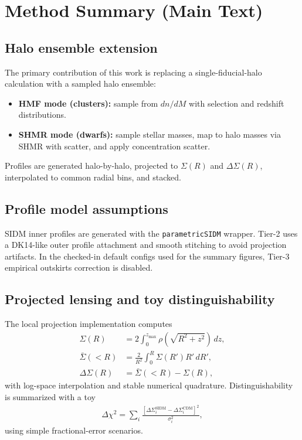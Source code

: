 \documentclass[11pt]{article}
\begin{document}
\section{Method Summary (Main Text)}
\subsection{Halo ensemble extension}
The primary contribution of this work is replacing a single-fiducial-halo calculation with a sampled halo ensemble:
\begin{itemize}[leftmargin=1.5em]
    \item \textbf{HMF mode (clusters):} sample from $dn/dM$ with selection and redshift distributions.
    \item \textbf{SHMR mode (dwarfs):} sample stellar masses, map to halo masses via SHMR with scatter, and apply concentration scatter.
\end{itemize}
Profiles are generated halo-by-halo, projected to $\Sigma(R)$ and $\Delta\Sigma(R)$, interpolated to common radial bins, and stacked.

\subsection{Profile model assumptions}
SIDM inner profiles are generated with the \texttt{parametricSIDM} wrapper. Tier-2 uses a DK14-like outer profile attachment and smooth stitching to avoid projection artifacts. In the checked-in default configs used for the summary figures, Tier-3 empirical outskirts correction is disabled.

\subsection{Projected lensing and toy distinguishability}
The local projection implementation computes
\begin{align}
\Sigma(R) &= 2\int_0^{z_{\max}}\rho\!\left(\sqrt{R^2+z^2}\right)\,dz,\\
\bar{\Sigma}(<R) &= \frac{2}{R^2}\int_0^R\Sigma(R')R'\,dR',\\
\Delta\Sigma(R) &= \bar{\Sigma}(<R)-\Sigma(R),
\end{align}
with log-space interpolation and stable numerical quadrature. Distinguishability is summarized with a toy
\begin{align}
\Delta\chi^2 = \sum_i \frac{\left[\Delta\Sigma_i^{\mathrm{SIDM}}-\Delta\Sigma_i^{\mathrm{CDM}}\right]^2}{\sigma_i^2},
\end{align}
using simple fractional-error scenarios.
\end{document}
